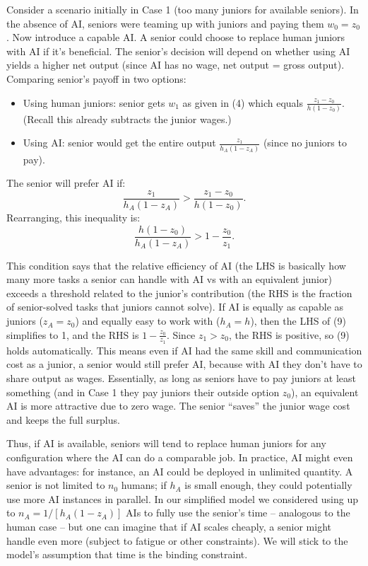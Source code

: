 \documentclass[12pt]{article}
\begin{document}
Consider a scenario initially in Case 1 (too many juniors for available
seniors). In the {absence of AI}, seniors were teaming up with
juniors and paying them \(w_0 = z_0\). Now introduce a capable AI. A
senior could choose to {replace human juniors with AI} if it's
beneficial. The senior's decision will depend on whether using AI yields
a higher net output (since AI has no wage, net output = gross output).
Comparing senior's payoff in two options:

\begin{itemize}

\item
  Using human juniors: senior gets \(w_1\) as given in (4) which equals
  \(\frac{z_1 - z_0}{h(1-z_0)}\). (Recall this already subtracts the
  junior wages.)
\item
  Using AI: senior would get the entire output
  \(\frac{z_1}{h_A(1-z_A)}\) (since no juniors to pay).
\end{itemize}

The senior will prefer AI if: 
\begin{equation}
\frac{z_1}{h_A(1-z_A)}
> \frac{z_1 - z_0}{h(1-z_0)}. \tag{8}
\end{equation}
Rearranging,
this inequality is:
\begin{equation}
\frac{h(1-z_0)}{h_A(1-z_A)} > 1
- \frac{z_0}{z_1}. \tag{9}
\end{equation}

This condition says that the {relative efficiency} of AI (the LHS
is basically how many more tasks a senior can handle with AI vs with an
equivalent junior) exceeds a threshold related to the junior's
contribution (the RHS is the fraction of senior-solved tasks that
juniors cannot solve). If AI is equally as capable as juniors
(\(z_A = z_0\)) and equally easy to work with (\(h_A = h\)), then the
LHS of (9) simplifies to 1, and the RHS is \(1 - \frac{z_0}{z_1}\).
Since \(z_1 > z_0\), the RHS is positive, so (9) holds automatically.
This means {even if AI had the same skill and communication cost as
a junior, a senior would still prefer AI}, because with AI they don't
have to share output as wages. Essentially, as long as seniors have to
pay juniors at least something (and in Case 1 they pay juniors their
outside option \(z_0\)), an equivalent AI is more attractive due to zero
wage. The senior ``saves'' the junior wage cost and keeps the full
surplus.

Thus, {if AI is available, seniors will tend to replace human
juniors} for any configuration where the AI can do a comparable job. In
practice, AI might even have advantages: for instance, an AI could be
deployed in {unlimited quantity}. A senior is not limited to
\(n_0\) humans; if \(h_A\) is small enough, they could potentially use
more AI instances in parallel. In our simplified model we considered
using up to \(n_A = 1/[h_A(1-z_A)]\) AIs to fully use the senior's time
-- analogous to the human case -- but one can imagine that if AI scales
cheaply, a senior might handle even more (subject to fatigue or other
constraints). We will stick to the model's assumption that time is the
binding constraint.
\end{document}
